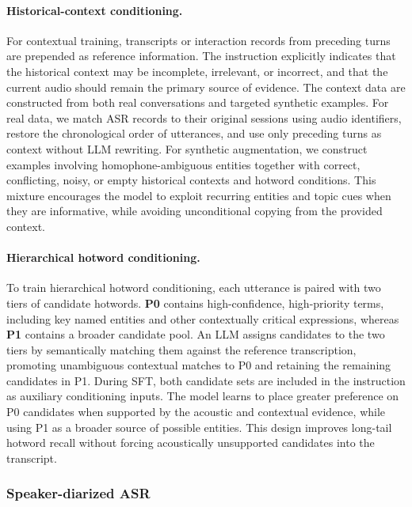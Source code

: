 \documentclass{article}
\begin{document}
\paragraph{Historical-context conditioning.}
For contextual training, transcripts or interaction records from preceding turns are prepended as reference information. The instruction explicitly indicates that the historical context may be incomplete, irrelevant, or incorrect, and that the current audio should remain the primary source of evidence.
The context data are constructed from both real conversations and targeted synthetic examples. For real data, we match ASR records to their original sessions using audio identifiers, restore the chronological order of utterances, and use only preceding turns as context without LLM rewriting.
For synthetic augmentation, we construct examples involving homophone-ambiguous entities together with correct, conflicting, noisy, or empty historical contexts and hotword conditions.
This mixture encourages the model to exploit recurring entities and topic cues when they are informative, while avoiding unconditional copying from the provided context.

\paragraph{Hierarchical hotword conditioning.}
To train hierarchical hotword conditioning, each utterance is paired with two tiers of candidate hotwords. \textbf{P0} contains high-confidence, high-priority terms, including key named entities and other contextually critical expressions, whereas \textbf{P1} contains a broader candidate pool. An LLM assigns candidates to the two tiers by semantically matching them against the reference transcription, promoting unambiguous contextual matches
to P0 and retaining the remaining candidates in P1.
During SFT, both candidate sets are included in the instruction as auxiliary conditioning inputs. The model learns to place greater preference on P0 candidates when supported by the acoustic and contextual evidence, while
using P1 as a broader source of possible entities. This design improves long-tail hotword recall without forcing acoustically unsupported candidates into the transcript.

\subsubsection{Speaker-diarized ASR}
\label{subsubsec:speaker-diarized-sft}
\end{document}
